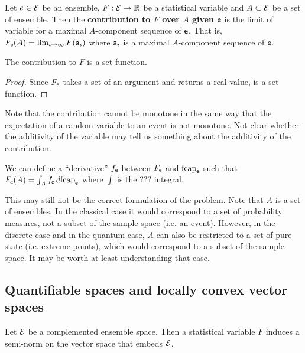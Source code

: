 \begin{defn}
	Let $e \in \Ens$ be an ensemble, $F : \Ens \to \mathbb{R}$ be a statistical variable and $A \subset \Ens$ be a set of ensemble. Then the \textbf{contribution to $F$ over $A$ given $\ens$} is the limit of variable for a maximal $A$-component sequence of $\ens$. That is, $F_{\ens}(A) = \lim_{i \to \infty} F(\ens[a]_i)$ where $\ens[a]_i$ is a maximal $A$-component sequence of $\ens$.
\end{defn}

\begin{prop}
	The contribution to $F$ is a set function.
\end{prop}

\begin{proof}
	Since $F_{\ens}$ takes a set of an argument and returns a real value, is a set function.
\end{proof}

\begin{remark}
	Note that the contribution cannot be monotone in the same way that the expectation of a random variable to an event is not monotone. Not clear whether the additivity of the variable may tell us something about the additivity of the contribution.
\end{remark}

\begin{conj}
	We can define a ``derivative'' $f_{\ens}$ between $F_{\ens}$ and $\fcap_{\ens}$ such that $F_{\ens}(A) = \int_A f_{\ens} \, d \fcap_{\ens}$ where $\int$ is the ??? integral.
\end{conj}

\begin{remark}
	This may still not be the correct formulation of the problem. Note that $A$ is a set of ensembles. In the classical case it would correspond to a set of probability measures, not a subset of the sample space (i.e. an event). However, in the discrete case and in the quantum case, $A$ can also be restricted to a set of pure state (i.e. extreme points), which would correspond to a subset of the sample space. It may be worth at least understanding that case.
\end{remark}

\subsection{Quantifiable spaces and locally convex vector spaces}

\begin{prop}
	Let $\Ens$ be a complemented ensemble space. Then a statistical variable $F$ induces a semi-norm on the vector space that embeds $\Ens$.
\end{prop}

